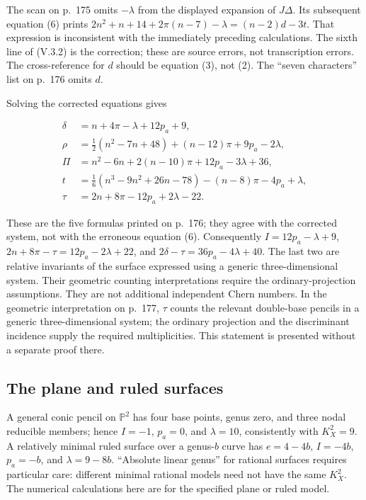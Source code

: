 The scan on p.~175 omits \(-\lambda\) from the displayed expansion of \(J\Delta\). Its subsequent equation (6) prints \(2n^2+n+14+2\pi(n-7)-\lambda=(n-2)d-3t\). That expression is inconsistent with the immediately preceding calculations. The sixth line of (V.3.2) is the correction; these are source errors, not transcription errors. The cross-reference for \(d\) should be equation (3), not (2). The ``seven characters'' list on p.~176 omits \(d\).

Solving the corrected equations gives

\[
\begin{aligned}
\delta&=n+4\pi-\lambda+12p_a+9,\\
\rho&=\tfrac12(n^2-7n+48)+(n-12)\pi+9p_a-2\lambda,\\
\Pi&=n^2-6n+2(n-10)\pi+12p_a-3\lambda+36,\\
t&=\tfrac16(n^3-9n^2+26n-78)-(n-8)\pi-4p_a+\lambda,\\
\tau&=2n+8\pi-12p_a+2\lambda-22.
\end{aligned} \tag{V.3.3}
\]

These are the five formulas printed on p.~176; they agree with the corrected system, not with the erroneous equation (6). Consequently \(I=12p_a-\lambda+9\), \(2n+8\pi-\tau=12p_a-2\lambda+22\), and \(2\delta-\tau=36p_a-4\lambda+40\). The last two are relative invariants of the surface expressed using a generic three-dimensional system. Their geometric counting interpretations require the ordinary-projection assumptions. They are not additional independent Chern numbers. In the geometric interpretation on p.~177, \(\tau\) counts the relevant double-base pencils in a generic three-dimensional system; the ordinary projection and the discriminant incidence supply the required multiplicities. This statement is presented without a separate proof there.

\subsection{The plane and ruled surfaces}

A general conic pencil on \(\mathbb P^2\) has four base points, genus zero, and three nodal reducible members; hence \(I=-1\), \(p_a=0\), and \(\lambda=10\), consistently with \(K_X^2=9\). A relatively minimal ruled surface over a genus-\(b\) curve has \(e=4-4b\), \(I=-4b\), \(p_a=-b\), and \(\lambda=9-8b\). ``Absolute linear genus'' for rational surfaces requires particular care: different minimal rational models need not have the same \(K_X^2\). The numerical calculations here are for the specified plane or ruled model.


